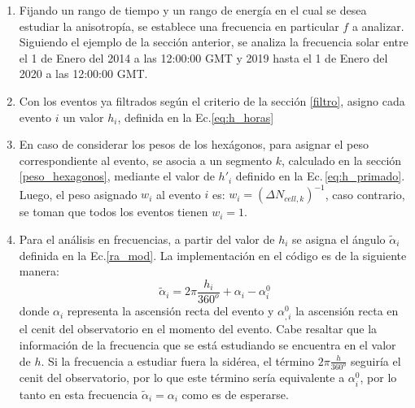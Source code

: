         \begin{enumerate}
        \item Fijando un rango de tiempo y un rango de energía en el cual se desea estudiar la anisotropía, se establece una frecuencia en particular $f$ a analizar. Siguiendo el ejemplo de la sección anterior, se analiza la frecuencia solar entre el 1 de Enero del 2014 a las 12:00:00 GMT y 2019 hasta el 1 de Enero del 2020 a las 12:00:00 GMT.

        \item Con los eventos ya filtrados según el criterio de la sección \ref{filtro}, asigno cada evento $i$ un valor $h_i$, definida en la Ec.\ref{eq:h_horas}

        \item En caso de considerar los pesos de los hexágonos, para asignar el peso correspondiente al evento, se asocia a un segmento $k$, calculado en la sección \ref{peso_hexagonos}, mediante el valor de $h'_i$ definido en la Ec.\,\ref{eq:h_primado}. Luego, el peso asignado $w_i$  al evento $i$ es: $ w_{i}= (\Delta N_{cell,k})^{-1}$, caso contrario, se toman que todos los eventos tienen $w_i=1$.
        
        \item Para el análisis en frecuencias, a partir del valor de $h_i$ se asigna el ángulo $\tilde{\alpha}_i$ definida en la Ec.\ref{ra_mod}. La implementación en el código es de la siguiente manera: 
        \begin{equation}
         \tilde{\alpha}_i = 2\pi \frac{h_i}{360^o} + \alpha_i -\alpha^0_{i}
        \end{equation}
        donde $\alpha_i$  representa la ascensión recta del evento y $\alpha^0_{,i}$ la ascensión recta en el cenit del observatorio en el momento del evento. Cabe resaltar que la información de la frecuencia que se está estudiando se encuentra en el valor de $h$. Si la frecuencia a estudiar fuera la sidérea, el término $2\pi \frac{h}{360^o} $ seguiría el cenit del observatorio, por lo que este término sería equivalente a $\alpha^0_{i}$, por lo tanto en esta frecuencia $ \tilde{\alpha}_i =\alpha_i$ como es de esperarse. 
        

\end{enumerate}
